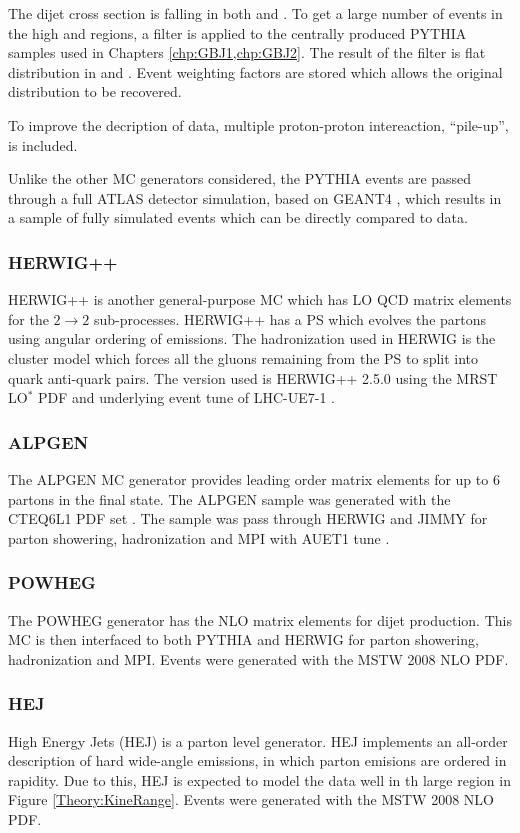 The dijet cross section is falling in both \ptb{} and \dy{}.
To get a large number of events in the high \ptb{} and \dy{} regions, a filter is applied to the centrally produced PYTHIA samples used in Chapters \ref{chp:GBJ1,chp:GBJ2}. 
The result of the filter is flat distribution in \ptb{} and \dy{}. 
Event weighting factors are stored which allows the original distribution to be recovered. 

To improve the decription of data, multiple proton-proton intereaction, ``pile-up'', is included.

Unlike the other MC generators considered, the PYTHIA events are passed through a full ATLAS detector simulation, based on GEANT4 \cite{ref:Geant4}, which results in a sample of fully simulated events which can be directly compared to data. 

\subsubsection{HERWIG++}

HERWIG++ is another general-purpose MC which has LO QCD matrix elements for the $2 \rightarrow 2$ sub-processes.
HERWIG++ has a PS which evolves the partons using angular ordering of emissions.
The hadronization used in HERWIG is the cluster model \cite{ref:ClusterModel} which forces all the gluons remaining from the PS to split into quark anti-quark pairs. 
The version used is HERWIG++ 2.5.0 \cite{ref:HERWIG} using the MRST LO$^*$ PDF and underlying event tune of LHC-UE7-1 \cite{ref:Herwigpp}. 
\subsubsection{ALPGEN}

The ALPGEN \cite{ref:ALPGEN} MC generator provides leading order matrix elements for up to 6 partons in the final state.
The ALPGEN sample was generated with the CTEQ6L1 PDF set \cite{ref:ALPGENPDF}.
The sample was pass through HERWIG and JIMMY \cite{ref:Jimmy} for parton showering, hadronization and MPI with AUET1 tune \cite{ref:ALPGENTune}.

\subsubsection{POWHEG}
The POWHEG generator \cite{ref:Powheg1,ref:Powheg2,ref:Powheg3} has the NLO matrix elements for dijet production. 
This MC is then interfaced to both PYTHIA and HERWIG for parton showering, hadronization and MPI.
Events were generated with the MSTW 2008 NLO PDF.


\subsubsection{HEJ}
High Energy Jets (HEJ) \cite{ref:HEJ1,ref:HEJ2} is a parton level generator. 
HEJ implements an all-order description of hard wide-angle emissions, in which parton emisions are ordered in rapidity.
Due to this, HEJ is expected to model the data well in th large \dy{} region in Figure \ref{Theory:KineRange}.
Events were generated with the MSTW 2008 NLO PDF.

